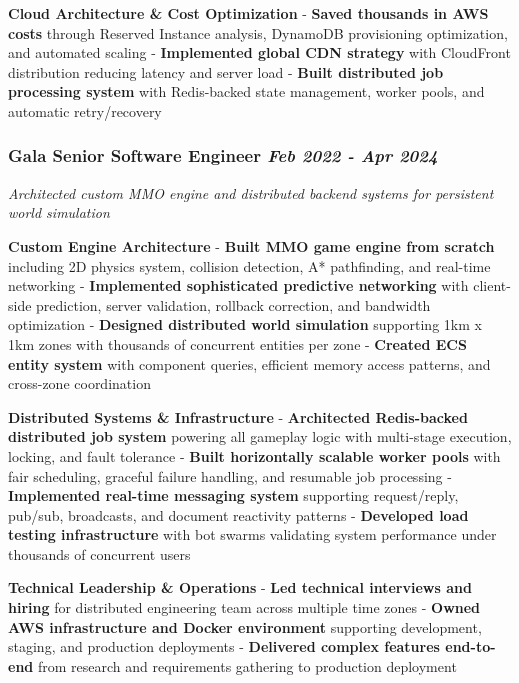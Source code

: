 \documentclass[
]{article}
\begin{document}
\textbf{Cloud Architecture \& Cost Optimization} - \textbf{Saved
thousands in AWS costs} through Reserved Instance analysis, DynamoDB
provisioning optimization, and automated scaling - \textbf{Implemented
global CDN strategy} with CloudFront distribution reducing latency and
server load - \textbf{Built distributed job processing system} with
Redis-backed state management, worker pools, and automatic
retry/recovery

\subsubsection{\texorpdfstring{\textbf{Gala} \textbar{} Senior Software
Engineer \textbar{} \emph{Feb 2022 - Apr
2024}}{Gala \textbar{} Senior Software Engineer \textbar{} Feb 2022 - Apr 2024}}\label{gala-senior-software-engineer-feb-2022---apr-2024}

\emph{Architected custom MMO engine and distributed backend systems for
persistent world simulation}

\textbf{Custom Engine Architecture} - \textbf{Built MMO game engine from
scratch} including 2D physics system, collision detection, A*
pathfinding, and real-time networking - \textbf{Implemented
sophisticated predictive networking} with client-side prediction, server
validation, rollback correction, and bandwidth optimization -
\textbf{Designed distributed world simulation} supporting 1km x 1km
zones with thousands of concurrent entities per zone - \textbf{Created
ECS entity system} with component queries, efficient memory access
patterns, and cross-zone coordination

\textbf{Distributed Systems \& Infrastructure} - \textbf{Architected
Redis-backed distributed job system} powering all gameplay logic with
multi-stage execution, locking, and fault tolerance - \textbf{Built
horizontally scalable worker pools} with fair scheduling, graceful
failure handling, and resumable job processing - \textbf{Implemented
real-time messaging system} supporting request/reply, pub/sub,
broadcasts, and document reactivity patterns - \textbf{Developed load
testing infrastructure} with bot swarms validating system performance
under thousands of concurrent users

\textbf{Technical Leadership \& Operations} - \textbf{Led technical
interviews and hiring} for distributed engineering team across multiple
time zones - \textbf{Owned AWS infrastructure and Docker environment}
supporting development, staging, and production deployments -
\textbf{Delivered complex features end-to-end} from research and
requirements gathering to production deployment
\end{document}
